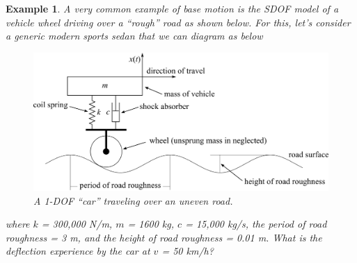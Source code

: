\documentclass[12pt,letter]{article}
\newtheorem{ex}{Example}
\numberwithin{ex}{section} %
\newenvironment{example}{\begin{mdframed}[middlelinewidth=0.5mm]\begin{ex}\normalfont}{\end{ex}\end{mdframed}}
\numberwithin{re}{section} %
\numberwithin{vcs}{section} %
\begin{document}
				\begin{example}
	
					A very common example of base motion is the SDOF model of a vehicle wheel driving over a ``rough'' road as shown below. For this, let's consider a generic modern sports sedan that we can diagram as below
					\begin{figure}[H]
						\centering
						\includegraphics[]{../figures/vehicle_on_road_example.png}
						\caption{A 1-DOF ``car'' traveling over an uneven road.}
					\end{figure}				
					\noindent where $k$ = 300,000 N/m, $m$ = 1600 kg, $c$ = 15,000 kg/s, the period of road roughness = 3 m, and the height of road roughness = 0.01 m. What is the deflection experience by the car at $v$ = 50 km/h?
					

\end{example}
\end{document}
